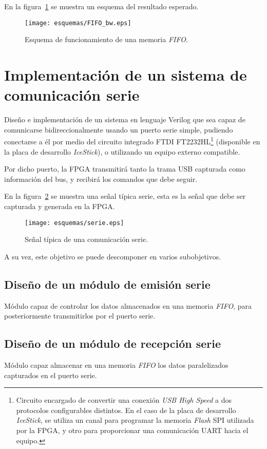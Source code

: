 En la figura~\ref{fig:FIFO_info} se muestra un esquema del resultado esperado.

\begin{figure}[htb]
    \centering
    \texttt{[image: esquemas/FIFO\_bw.eps]}
    \caption{Esquema de funcionamiento de una memoria \emph{FIFO}.}
    \label{fig:FIFO_info}
\end{figure}



\section{Implementación de un sistema de comunicación serie}
Diseño e implementación de un sistema en lenguaje Verilog que sea capaz de comunicarse bidireccionalmente usando un puerto serie simple\cite{design-uart-vhdl}, pudiendo conectarse a él por medio del circuito integrado FTDI FT2232HL\footnote{Circuito encargado de convertir una conexión \emph{USB High Speed} a dos protocolos configurables distintos. En el caso de la placa de desarrollo \emph{IceStick}, se utiliza un canal para programar la memoria \emph{Flash} SPI utilizada por la FPGA, y otro para proporcionar una comunicación UART hacia el equipo.} (disponible en la placa de desarrollo \emph{IceStick}\cite{icestickmanual}), o utilizando un equipo externo compatible.

Por dicho puerto, la FPGA transmitirá tanto la trama USB capturada como información del bus, y recibirá los comandos que debe seguir.

En la figura~\ref{fig:serie_esquema} se muestra una señal típica serie, esta es la señal que debe ser capturada y generada en la FPGA.

\begin{figure}[htb]
    \centering
    \texttt{[image: esquemas/serie.eps]}
    \caption{Señal típica de una comunicación serie.}
    \label{fig:serie_esquema}
\end{figure}

A su vez, este objetivo se puede descomponer en varios subobjetivos.

\subsection{Diseño de un módulo de emisión serie}
Módulo capaz de controlar los datos almacenados en una memoria \emph{FIFO}, para posteriormente transmitirlos por el puerto serie.

\subsection{Diseño de un módulo de recepción serie}
Módulo capaz almacenar en una memoria \emph{FIFO} los datos paralelizados capturados en el puerto serie.



